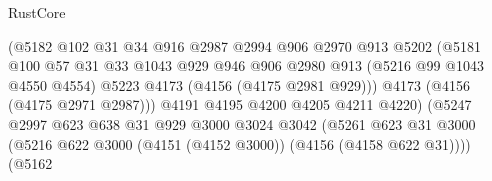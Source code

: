 \begin{lexlean}{RustCore}
\begin{coremodule}
                                        (@5182
                                          @102
                                          @31
                                          @34
                                          @916
                                          @2987
                                          @2994
                                          @906
                                          @2970
                                          @913
                                          @5202
                                          (@5181
                                            @100
                                            @57
                                            @31
                                            @33
                                            @1043
                                            @929
                                            @946
                                            @906
                                            @2980
                                            @913
                                            (@5216 @99 @1043 @4550 @4554)
                                            @5223
                                            @4173
                                            (@4156 (@4175 @2981 @929)))
                                          @4173
                                          (@4156 (@4175 @2971 @2987)))
                                        @4191
                                        @4195
                                        @4200
                                        @4205
                                        @4211
                                        @4220)
                                      (@5247
                                        @2997
                                        @623
                                        @638
                                        @31
                                        @929
                                        @3000
                                        @3024
                                        @3042
                                        (@5261
                                          @623
                                          @31
                                          @3000
                                          (@5216
                                            @622
                                            @3000
                                            (@4151 (@4152 @3000))
                                            (@4156 (@4158 @622 @31))))
                                        (@5162

\end{coremodule}
\end{lexlean}
